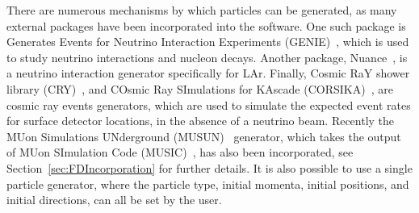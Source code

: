 There are numerous mechanisms by which particles can be generated, as many external packages have been incorporated into the software. One such package is Generates Events for Neutrino Interaction Experiments (GENIE)~\citep{GENIE}, which is used to study neutrino interactions and nucleon decays. Another package, Nuance~\citep{Nuance}, is a neutrino interaction generator specifically for LAr. Finally, Cosmic RaY shower library (CRY)~\citep{CRY,CRY2}, and COsmic Ray SImulations for KAscade (CORSIKA)~\citep{CORSIKA}, are cosmic ray events generators, which are used to simulate the expected event rates for surface detector locations, in the absence of a neutrino beam. Recently the MUon Simulations UNderground (MUSUN)~\citep{MUSUN, MUSUN2} generator, which takes the output of MUon SImulation Code (MUSIC)~\citep{MUSUN, MUSIC, MUSIC2}, has also been incorporated, see Section~\ref{sec:FDIncorporation} for further details. It is also possible to use a single particle generator, where the particle type, initial momenta, initial positions, and initial directions, can all be set by the user. \\

